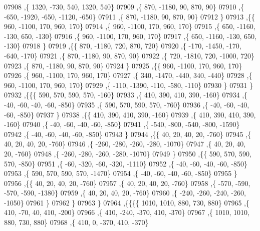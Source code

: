 \begin{DoxyCode}
07908     ,\{  1320,  -730,   540,  1320,   540\}
07909     ,\{   870, -1180,    90,   870,    90\}
07910     ,\{  -650, -1920,  -650, -1120,  -650\}
07911     ,\{   870, -1180,    90,   870,    90\}
07912     \}
07913    ,\{\{   960, -1100,   170,   960,   170\}
07914     ,\{   960, -1100,   170,   960,   170\}
07915     ,\{   650, -1160,  -130,   650,  -130\}
07916     ,\{   960, -1100,   170,   960,   170\}
07917     ,\{   650, -1160,  -130,   650,  -130\}
07918     \}
07919    ,\{\{   870, -1180,   720,   870,   720\}
07920     ,\{  -170, -1450,  -170,  -640,  -170\}
07921     ,\{   870, -1180,    90,   870,    90\}
07922     ,\{   720, -1810,   720, -1000,   720\}
07923     ,\{   870, -1180,    90,   870,    90\}
07924     \}
07925    ,\{\{   960, -1100,   170,   960,   170\}
07926     ,\{   960, -1100,   170,   960,   170\}
07927     ,\{   340, -1470,  -440,   340,  -440\}
07928     ,\{   960, -1100,   170,   960,   170\}
07929     ,\{  -110, -1390,  -110,  -580,  -110\}
07930     \}
07931    \}
07932   ,\{\{\{   590,   570,   590,   570,  -160\}
07933     ,\{   410,   390,   410,   390,  -160\}
07934     ,\{   -40,   -60,   -40,   -60,  -850\}
07935     ,\{   590,   570,   590,   570,  -760\}
07936     ,\{   -40,   -60,   -40,   -60,  -850\}
07937     \}
07938    ,\{\{   410,   390,   410,   390,  -160\}
07939     ,\{   410,   390,   410,   390,  -160\}
07940     ,\{   -40,   -60,   -40,   -60,  -850\}
07941     ,\{  -540,  -800,  -540,  -800, -1590\}
07942     ,\{   -40,   -60,   -40,   -60,  -850\}
07943     \}
07944    ,\{\{    40,    20,    40,    20,  -760\}
07945     ,\{    40,    20,    40,    20,  -760\}
07946     ,\{  -260,  -280,  -260,  -280, -1070\}
07947     ,\{    40,    20,    40,    20,  -760\}
07948     ,\{  -260,  -280,  -260,  -280, -1070\}
07949     \}
07950    ,\{\{   590,   570,   590,   570,  -850\}
07951     ,\{   -60,  -320,   -60,  -320, -1110\}
07952     ,\{   -40,   -60,   -40,   -60,  -850\}
07953     ,\{   590,   570,   590,   570, -1470\}
07954     ,\{   -40,   -60,   -40,   -60,  -850\}
07955     \}
07956    ,\{\{    40,    20,    40,    20,  -760\}
07957     ,\{    40,    20,    40,    20,  -760\}
07958     ,\{  -570,  -590,  -570,  -590, -1380\}
07959     ,\{    40,    20,    40,    20,  -760\}
07960     ,\{  -240,  -260,  -240,  -260, -1050\}
07961     \}
07962    \}
07963   \}
07964  ,\{\{\{\{  1010,  1010,   880,   730,   880\}
07965     ,\{   410,   -70,    40,   410,  -200\}
07966     ,\{   410,  -240,  -370,   410,  -370\}
07967     ,\{  1010,  1010,   880,   730,   880\}
07968     ,\{   410,     0,  -370,   410,  -370\}

\end{DoxyCode}
